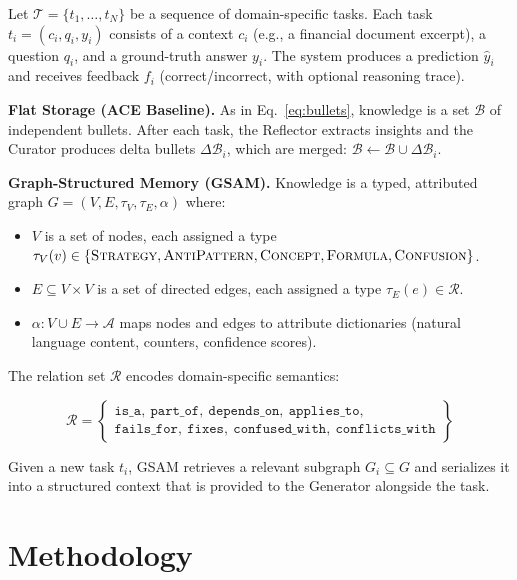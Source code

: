 \documentclass[12pt,a4paper]{article}
\begin{document}
Let $\mathcal{T} = \{t_1, \ldots, t_N\}$ be a sequence of domain-specific tasks. Each task $t_i = (c_i, q_i, y_i)$ consists of a context $c_i$ (e.g., a financial document excerpt), a question $q_i$, and a ground-truth answer $y_i$. The system produces a prediction $\hat{y}_i$ and receives feedback $f_i$ (correct/incorrect, with optional reasoning trace).

\textbf{Flat Storage (ACE Baseline).} As in Eq.~\ref{eq:bullets}, knowledge is a set $\mathcal{B}$ of independent bullets. After each task, the Reflector extracts insights and the Curator produces delta bullets $\Delta\mathcal{B}_i$, which are merged: $\mathcal{B} \leftarrow \mathcal{B} \cup \Delta\mathcal{B}_i$.

\textbf{Graph-Structured Memory (GSAM).} Knowledge is a typed, attributed graph $G = (V, E, \tau_V, \tau_E, \alpha)$ where:

\begin{itemize}[leftmargin=*]
\item $V$ is a set of nodes, each assigned a type $\tau_V(v) \in \{\textsc{Strategy}, \textsc{AntiPattern}, \textsc{Concept}, \textsc{Formula}, \textsc{Confusion}\}$.
\item $E \subseteq V \times V$ is a set of directed edges, each assigned a type $\tau_E(e) \in \mathcal{R}$.
\item $\alpha: V \cup E \rightarrow \mathcal{A}$ maps nodes and edges to attribute dictionaries (natural language content, counters, confidence scores).
\end{itemize}

The relation set $\mathcal{R}$ encodes domain-specific semantics:

\begin{equation}
\mathcal{R} = \left\{
\begin{array}{l}
\texttt{is\_a},\ \texttt{part\_of},\ \texttt{depends\_on},\ \texttt{applies\_to},\\
\texttt{fails\_for},\ \texttt{fixes},\ \texttt{confused\_with},\ \texttt{conflicts\_with}
\end{array}
\right\}
\label{eq:relations}
\end{equation}

Given a new task $t_i$, GSAM retrieves a relevant subgraph $G_i \subseteq G$ and serializes it into a structured context that is provided to the Generator alongside the task.

\section{Methodology}
\label{sec:method}
\end{document}

